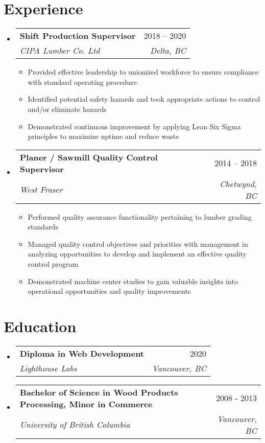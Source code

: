 \documentclass[letterpaper,10.5pt]{article}
\makeatletter
\newcommand{\resumeItem}[1]{
  \item\small{
    {#1 \vspace{-2pt}}
  }
}
\newcommand{\resumeSubheading}[4]{
  \vspace{-2pt}\item
    \begin{tabular*}{0.97\textwidth}[t]{l@{\extracolsep{\fill}}r}
      \textbf{#1} & #2 \\
      \textit{\small#3} & \textit{\small #4} \\
    \end{tabular*}\vspace{-7pt}
}
\newcommand{\resumeSubHeadingListStart}{\begin{itemize}[leftmargin=0.15in, label={}]}
\newcommand{\resumeSubHeadingListEnd}{\end{itemize}}
\newcommand{\resumeItemListStart}{\begin{itemize}}
\newcommand{\resumeItemListEnd}{\end{itemize}\vspace{-5pt}}
\makeatother
\begin{document}
\section{Experience}
  \resumeSubHeadingListStart

    \resumeSubheading
      {Shift Production Supervisor}{2018 -- 2020}
      {CIPA Lumber Co. Ltd}{Delta, BC}
      \resumeItemListStart
        \resumeItem{Provided effective leadership to unionized workforce to ensure compliance with standard operating procedure}
        \resumeItem{Identified potential safety hazards and took appropriate actions to control and/or eliminate hazards }
        \resumeItem{Demonstrated continuous improvement by applying Lean Six Sigma principles to maximize uptime and reduce waste}
      \resumeItemListEnd

    \resumeSubheading
      {Planer / Sawmill Quality Control Supervisor}{2014 -- 2018}
      {West Fraser}{Chetwynd, BC}
      \resumeItemListStart
        \resumeItem{Performed quality assurance functionality pertaining to lumber grading standards  }
        \resumeItem{Managed quality control objectives and priorities with management in analyzing opportunities to develop and implement an effective quality control program}
        \resumeItem{Demonstrated machine center studies to gain valuable insights into operational opportunities and quality improvements}
    \resumeItemListEnd


  \resumeSubHeadingListEnd
  
\section{Education}
  \resumeSubHeadingListStart
    \resumeSubheading
      {Diploma in Web Development}{2020}
      {Lighthouse Labs}{Vancouver, BC}
    \resumeSubheading
      {Bachelor of Science in Wood Products Processing, Minor in Commerce}{2008 - 2013}
      {University of British Columbia}{Vancouver, BC}
  \resumeSubHeadingListEnd







\end{document}
